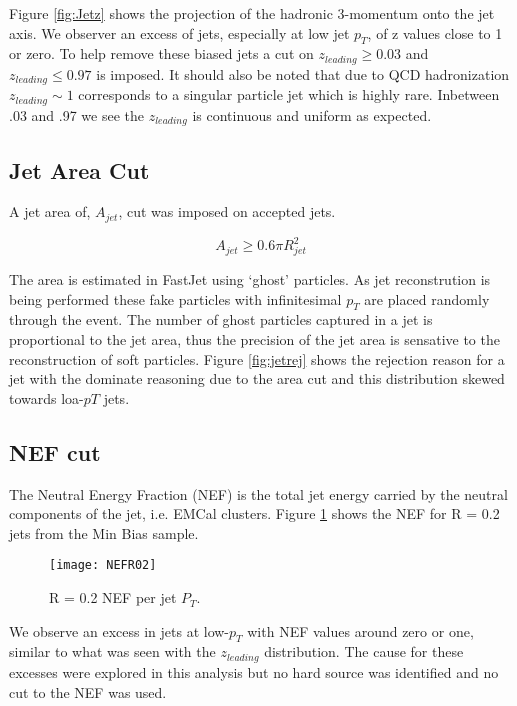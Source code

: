 \noindent
Figure \ref{fig:Jetz} shows the projection of the hadronic 3-momentum onto the jet axis.  We observer an excess of jets, especially at low jet $p_{T}$, of z values close to 1 or zero.  To help remove these biased jets a cut on $ z_{leading} \geq 0.03$ and $z_{leading} \leq 0.97$ is imposed.  It should also be noted that due to QCD hadronization $z_{leading} \sim 1$ corresponds to a singular particle jet which is highly rare.  Inbetween .03 and .97 we see the $z_{leading}$ is continuous and uniform as expected.  

\subsection{Jet Area Cut}

A jet area of, $A_{jet}$, cut was imposed on accepted jets.

\begin{equation}
A_{jet} \geq 0.6 \pi R_{jet}^{2}
\label{eq:AreaJet}
\end{equation}

The area is estimated in FastJet using `ghost' particles.  As jet reconstrution is being performed these fake particles with infinitesimal $p_{T}$ are placed randomly through the event.  The number of ghost particles captured in a jet is proportional to the jet area, thus the precision of the jet area is sensative to the reconstruction of soft particles.  Figure \ref{fig:jetrej} shows the rejection reason for a jet with the dominate reasoning due to the area cut and this distribution skewed towards loa-$p{T}$ jets.

\subsection{NEF cut}
The Neutral Energy Fraction (NEF) is the total jet energy carried by the neutral components of the jet, i.e. EMCal clusters.  Figure \ref{fig:JetNEF} shows the NEF for R = 0.2 jets from the Min Bias sample.

\begin{figure}[h]
\texttt{[image: NEFR02]}
\centering
\caption{R = 0.2 NEF per jet $P_{T}$.}
\label{fig:JetNEF}
\end{figure}
\noindent
We observe an excess in jets at low-$p_{T}$ with NEF values around zero or one, similar to what was seen with the $z_{leading}$ distribution.  The cause for these excesses were explored in this analysis but no hard source was identified and no cut to the NEF was used.

